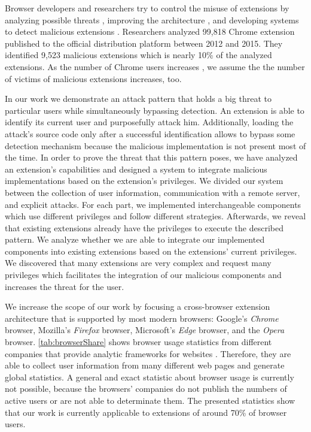 	Browser developers and researchers try to control the misuse of extensions by analyzing possible threats \cite{Liu12chromeextensions:, liu2011botnet, TerLouw:2007:EWB:1420581.1420583}, improving the architecture \cite{Barth10protectingbrowsers, Carlini:2012:EGC:2362793.2362800, cs2015sentinel, TerLouw:2007:EWB:1420581.1420583}, and developing systems to detect malicious extensions \cite{184485, 190984, Bandhakavi:2011:VBE:1995376.1995398}. Researchers analyzed 99,818 Chrome extension published to the official distribution platform between 2012 and 2015. They identified 9,523 malicious extensions which is nearly 10\% of the analyzed extensions. As the number of Chrome users increases \cite{w3browserStats, statcounter, netmarketshare}, we assume the the number of victims of malicious extensions increases, too.

	In our work we demonstrate an attack pattern that holds a big threat to particular users while simultaneously bypassing detection. An extension is able to identify its current user and purposefully attack him. Additionally, loading the attack's source code only after a successful identification allows to bypass some detection mechanism because the malicious implementation is not present most of the time. In order to prove the threat that this pattern poses, we have analyzed an extension's capabilities and designed a system to integrate malicious implementations based on the extension's privileges. We divided our system between the collection of user information, communication with a remote server, and explicit attacks. For each part, we implemented interchangeable components which use different privileges and follow different strategies. Afterwards, we reveal that existing extensions already have the privileges to execute the described pattern. We analyze whether we are able to integrate our implemented components into existing extensions based on the extensions' current privileges. We discovered that many extensions are very complex and request many privileges which facilitates the integration of our malicious components and increases the threat for the user.
	
	We increase the scope of our work by focusing a cross-browser extension architecture that is supported by most modern browsers: Google's \textit{Chrome} browser, Mozilla's \textit{Firefox} browser, Microsoft's \textit{Edge} browser, and the \textit{Opera} browser. \autoref{tab:browserShare} shows browser usage statistics from different companies  that provide analytic frameworks for websites \cite{w3browserStats, statcounter, netmarketshare}. Therefore, they are able to collect user information from many different web pages and generate global statistics. A general and exact statistic about browser usage is currently not possible, because the browsers' companies do not publish the numbers of active users or are not able to determinate them. The presented statistics show that our work is currently applicable to extensions of around 70\% of browser users.

